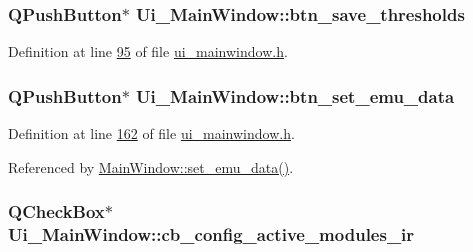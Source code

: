 \hypertarget{a00080_ac265ae0ccaa1154deaa634d19415f775}{
\subsubsection[{btn\+\_\+save\+\_\+thresholds}]{\setlength{\rightskip}{0pt plus 5cm}Q\+Push\+Button$\ast$ Ui\+\_\+\+Main\+Window\+::btn\+\_\+save\+\_\+thresholds}}\label{a00080_ac265ae0ccaa1154deaa634d19415f775}


Definition at line \hyperlink{a00139_source_l00095}{95} of file \hyperlink{a00139_source}{ui\+\_\+mainwindow.\+h}.

\hypertarget{a00080_ad05944ce9c8afb0ab60549a326b8e0af}{
\subsubsection[{btn\+\_\+set\+\_\+emu\+\_\+data}]{\setlength{\rightskip}{0pt plus 5cm}Q\+Push\+Button$\ast$ Ui\+\_\+\+Main\+Window\+::btn\+\_\+set\+\_\+emu\+\_\+data}}\label{a00080_ad05944ce9c8afb0ab60549a326b8e0af}


Definition at line \hyperlink{a00139_source_l00162}{162} of file \hyperlink{a00139_source}{ui\+\_\+mainwindow.\+h}.



Referenced by \hyperlink{a00134_source_l00606}{Main\+Window\+::set\+\_\+emu\+\_\+data()}.

\hypertarget{a00080_abef4ef3d5d03026de5d5e172eb0335a6}{
\subsubsection[{cb\+\_\+config\+\_\+active\+\_\+modules\+\_\+ir}]{\setlength{\rightskip}{0pt plus 5cm}Q\+Check\+Box$\ast$ Ui\+\_\+\+Main\+Window\+::cb\+\_\+config\+\_\+active\+\_\+modules\+\_\+ir}}\label{a00080_abef4ef3d5d03026de5d5e172eb0335a6}


